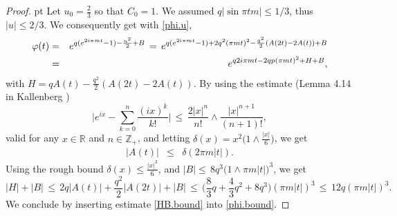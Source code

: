 \documentclass[11pt,draft,reqno]{amsart}
\theoremstyle{definition}
\theoremstyle{remarks}
\numberwithin{equation}{section}
\def \d{{\delta}}
\def \p{{\varphi}}
\def\R{{\mathbb R}}
\def\Z{{\mathbb Z}}
\begin{document}
\begin{proof}
 pt
Let $u_0=\frac{2}{3}$ so that $C_0=1$. We assumed $q|\sin \pi t m|\le 1/3$, thus $|u|\le 2/3$. We consequently  get with \eqref{phi.u}, 
\begin{eqnarray}\label{phi.bound} \p(t)&=&  e^{q ( e^{2i\pi mt} -1 )  -\frac{u^2}{2} +B }\, =\, 
e^{q ( e^{2i\pi mt} -1 ) +    2q^2(  \pi mt)^2-  \frac{q^2}{2}(A(2t)-2A( t))+B}
\cr &=&e^{  q      2i\pi mt   - 2qp (  \pi mt)^2 +H+B}
, 
\end{eqnarray}
with $H=q A(t) -    \frac{q^2}{2}(A(2t)-2A( t))$. By using 
 the   estimate (Lemma 4.14 in Kallenberg \cite{Ka})
 \begin{equation}\label{expit}\Big|e^{ix} -\sum_{k=0}^n \frac{(ix)^k}{k!}\Big|\,\le\, \frac{2|x|^n}{n!}\wedge \frac{ |x|^{n+1}}{(n+1)!},
 \end{equation}
valid for any $x\in\R$ and $n\in \Z_+$, and    letting $\d(x)=x^2\big(1\wedge   \frac{|x|}{6} \big)$, we get 
\begin{eqnarray}\label{At.est}
 |A(t)|&\le&
 \d(2\pi m|t|)
.\end{eqnarray}
Using the rough bound  $\d(x)\le  \frac{|x|^3}{6} $, and   $|B|
\le\,8q^3\big(1  \wedge \pi m | t|\big)^3$, we get 
 \begin{equation}\label{HB.bound} |H|+|B|\, \le \, 2q|A(t)|+\frac{q^2}{2}|A(2t)| +|B|\, \le \, \big(\frac83 q+\frac43q^2+8q^3\big)(\pi m|t|)^3
\, \le \,  12 q (\pi m|t|)^3.
\end{equation}
 We conclude by inserting estimate  \eqref{HB.bound} into \eqref{phi.bound}.  \end{proof}
 
\end{document}
